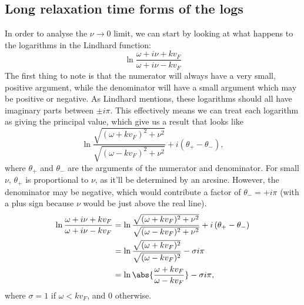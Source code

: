 \documentclass[../../main.tex]{subfiles}
\newcommand{\vf}{v_F}
\begin{document}
\subsection{Long relaxation time forms of the logs}
In order to analyse the $\nu \rightarrow 0$ limit, we can start by looking at what happens to the logarithms in the Lindhard function:
\begin{equation}
	\ln\frac{\omega + i \nu + k\vf}{\omega + i \nu - k\vf}
\end{equation}
The first thing to note is that the numerator will always have a very small, positive argument, while the denominator will have a small argument which may be positive or negative. As Lindhard mentions, these logarithms should all have imaginary parts between $\pm i \pi$. This effectively means we can treat each logarithm as giving the principal value, which give us a result that looks like
\begin{equation}
	\ln\frac{\sqrt{(\omega + k\vf) ^2 + \nu^2}}{\sqrt{(\omega - k\vf) ^2 + \nu^2}} + i \left(\theta_+ - \theta_- \right),
\end{equation}
where $\theta_+$ and $\theta_-$ are the arguments of the numerator and denominator. For small $\nu$, $\theta_+$ is proportional to $\nu$, as it'll be determined by an arcsine. However, the denominator may be negative, which would contribute a factor of $\theta_- = +i\pi$ (with a plus sign because $\nu$ would be just above the real line).
\begin{align}
	\ln\frac{\omega + i \nu + k\vf}{\omega + i \nu - k\vf} &= \ln\frac{\sqrt{(\omega + k\vf) ^2 + \nu^2}}{\sqrt{(\omega - k\vf) ^2 + \nu^2}} + i \left(\theta_+ - \theta_- \right) \\
	&= \ln\frac{\sqrt{(\omega + k\vf) ^2}}{\sqrt{(\omega - k\vf) ^2}} - \sigma i \pi \\
	&= \ln\abs{\frac{\omega + k\vf}{\omega - k\vf}} - \sigma i \pi,
\end{align}
where $\sigma = 1$ if $\omega < k\vf$, and $0$ otherwise.
\end{document}
